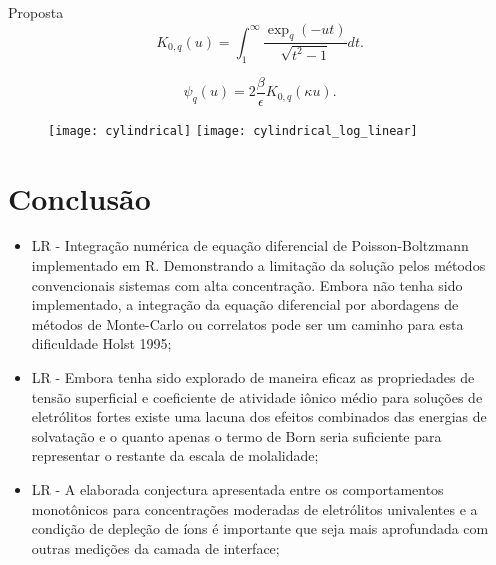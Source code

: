 \documentclass{beamer}
\begin{document}
\begin{frame}{Proposta}
\begin{equation}
 K_{0,q}(u) =  \int_{1}^{\infty}\frac{\exp_q(-u t)}{\sqrt{t^2-1}}dt.
\end{equation}

\begin{equation}
 \label{eq:cylq}
 \psi_q(u) =  2\frac{\beta}{\epsilon}  K_{0,q}(\kappa u).
\end{equation}
\begin{figure}
\centering
	{\texttt{[image: cylindrical]}}
	\qquad
	{\texttt{[image: cylindrical\_log\_linear]}}
 \label{fig:cylindrical_q}
\end{figure}



\end{frame}

\section{Conclusão}

\begin{frame}

	\begin{itemize}
\item LR - Integração numérica de equação diferencial de Poisson-Boltzmann implementado em R. 
      Demonstrando a limitação da solução pelos métodos convencionais sistemas 
      com alta concentração. Embora não tenha sido implementado, a integração 
      da equação diferencial por abordagens de métodos de Monte-Carlo ou correlatos 
      pode ser um caminho para esta dificuldade Holst 1995; 
\item LR - Embora tenha sido explorado de maneira eficaz as propriedades de tensão superficial 
      e coeficiente de atividade iônico médio para soluções de eletrólitos fortes existe 
      uma lacuna dos efeitos combinados das energias de solvatação e o quanto apenas o termo de Born 
      seria suficiente para representar o restante da escala de molalidade; 
\item LR - A elaborada conjectura apresentada entre os comportamentos monotônicos para 
      concentrações moderadas de eletrólitos univalentes  e a condição de depleção de
      íons é importante que seja mais aprofundada com outras medições da camada 
      de interface; 
	\end{itemize}
\end{frame}
\end{document}
